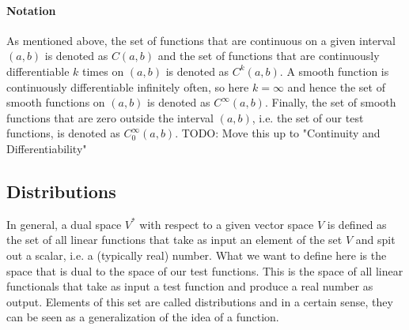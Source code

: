 
\paragraph{Notation}
As mentioned above, the set of functions that are continuous on a given interval $(a,b)$ is denoted as $C(a,b)$ and the set of functions that are continuously differentiable $k$ times on $(a,b)$ is denoted as $C^k(a,b)$. A smooth function is continuously differentiable infinitely often, so here $k = \infty$ and hence the set of smooth functions on $(a,b)$ is denoted as $C^{\infty}(a,b)$. Finally, the set of smooth functions that are zero outside the interval $(a,b)$, i.e. the set of our test functions, is denoted as  $C_0^{\infty}(a,b)$. TODO: Move this up to "Continuity and Differentiability"





\subsection{Distributions}
In general, a dual space $V^*$ with respect to a given vector space $V$ is defined as the set of all linear functions that take as input an element of the set $V$ and spit out a scalar, i.e. a (typically real) number. What we want to define here is the space that is dual to the space of our test functions. This is the space of all linear functionals that take as input a test function and produce a real number as output. Elements of this set are called distributions and in a certain sense, they can be seen as a generalization of the idea of a function. 






